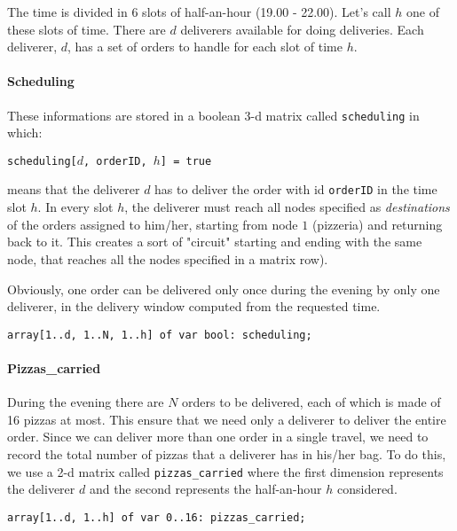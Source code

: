 \documentclass[10pt]{article}
\begin{document}
	The time is divided in 6 slots of half-an-hour (19.00 - 22.00). Let's call
	$h$ one of these slots of time.
	There are $d$ deliverers available for doing deliveries.
	Each deliverer, $d$, has a set of orders to handle for each slot of time $h$.

    \paragraph*{Scheduling}
	These informations are stored in a boolean 3-d matrix called 
	\texttt{scheduling} in which: 
	
	\begin{center}
		\texttt{scheduling[$d$, orderID, $h$] = true}
	\end{center}
	
	means that the deliverer $d$ has to deliver the order with id 
	\texttt{orderID} in the time slot $h$. In every slot $h$, the deliverer must 
	reach all nodes specified as \textit{destinations} of the orders assigned to 
	him/her, starting from node $1$ (pizzeria) and returning back to it. This creates
	 a sort of "circuit" starting and ending with the same node, that reaches all the 
	nodes specified in a matrix row).

	Obviously, one order can be delivered only once during the evening by only
	one deliverer, in the delivery window computed from the requested time.

	\begin{center}
		\texttt{array[1..d, 1..N, 1..h] of var bool: scheduling;}
	\end{center}

	\paragraph*{Pizzas\_carried}
	During the evening there are $N$ orders to be delivered, each of which is made of
	16 pizzas at most. This ensure that we need only a deliverer to deliver the 
	entire order.
	Since we can deliver more than one order in a single travel, we need to
	record the total number of pizzas that a deliverer has in his/her bag.
	To do this, we use a 2-d matrix called \texttt{pizzas\_carried} where
	the first dimension represents the deliverer $d$ and the second 
	represents the half-an-hour $h$ considered.


	\begin{center}
		\texttt{array[1..d, 1..h] of var 0..16: pizzas\_carried;}
	\end{center}
\end{document}
